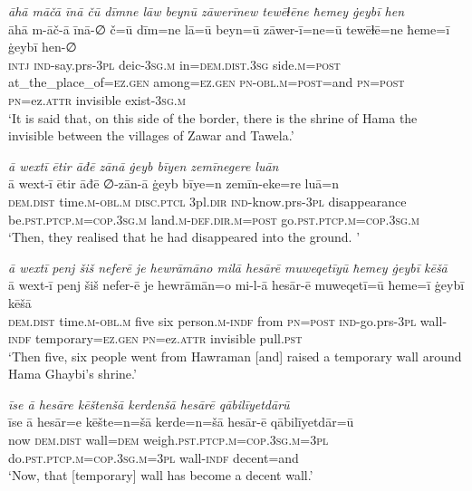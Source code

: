 \ea \label{BP.178}
\textit{āhā māčā īnā čū dīmne lāw beynū zāwerīnew tewēɫēne ħemey ġeybī hen} \\ 
\gll āhā m-āč-ā īnā-∅ č=ū dīm=ne lā=ū beyn=ū zāwer-ī=ne=ū tewēɫē=ne ħeme=ī ġeybī hen-∅ \\ 
 \textsc{intj} \textsc{ind-}say.prs\textsc{-3pl} deic\textsc{-3sg}\textsc{.m} in=\textsc{dem.dist}\textsc{.3sg} side\textsc{.m}\textsc{=\textsc{post}} at\_the\_place\_of\textsc{=ez.gen} among\textsc{=ez.gen} \textsc{pn}\textsc{-obl}\textsc{.m}\textsc{=\textsc{post}}=and \textsc{pn}\textsc{=\textsc{post}} \textsc{pn}=ez.\textsc{attr} invisible exist\textsc{-3sg}\textsc{.m} \\ 
\glt `It is said that, on this side of the border, there is the shrine of Hama the invisible between the villages of Zawar and Tawela.'
\z 
 
\ea \label{BP.197}
\textit{ā wextī ētir āđē zānā ġeyb bīyen zemīnegere luān} \\ 
\gll ā wext-ī ētir āđē ∅-zān-ā ġeyb bīye=n zemīn-eke=re luā=n \\ 
 \textsc{dem.dist} time\textsc{.m}\textsc{-obl}\textsc{.m} \textsc{disc.ptcl} 3pl\textsc{.dir} \textsc{ind-}know.prs\textsc{-3pl} disappearance be\textsc{.pst}\textsc{.ptcp}\textsc{.m}\textsc{=cop}\textsc{.3sg}\textsc{.m} land\textsc{.m}\textsc{-def}\textsc{.dir}\textsc{.m}\textsc{=\textsc{post}} go\textsc{.pst}\textsc{.ptcp}\textsc{.m}\textsc{=cop}\textsc{.3sg}\textsc{.m} \\ 
\glt `Then, they realised that he had disappeared into the ground. '
\z 
 
\ea \label{BP.203}
\textit{ā wextī penj šiš neferē je hewrāmāno milā hesārē muweqetīyū ħemey ġeybī kēšā} \\ 
\gll ā wext-ī penj šiš nefer-ē je hewrāmān=o mi-l-ā hesār-ē muweqetī=ū ħeme=ī ġeybī kēšā \\ 
 \textsc{dem.dist} time\textsc{.m}\textsc{-obl}\textsc{.m} five six person\textsc{.m}\textsc{-indf} from \textsc{pn}\textsc{=\textsc{post}} \textsc{ind-}go.prs\textsc{-3pl} wall\textsc{-indf} temporary\textsc{=ez.gen} \textsc{pn}=ez.\textsc{attr} invisible pull\textsc{.pst} \\ 
\glt `Then five, six people went from Hawraman [and] raised a temporary wall around Hama Ghaybi’s shrine.'
\z 
 
\ea \label{BP.204}
\textit{īse ā hesāre kēštenšā kerdenšā hesārē qābilīyetdārū} \\ 
\gll īse ā hesār=e kēšte=n=šā kerde=n=šā hesār-ē qābilīyetdār=ū \\ 
 now \textsc{dem.dist} wall\textsc{=dem} weigh\textsc{.pst}\textsc{.ptcp}\textsc{.m}\textsc{=cop}\textsc{.3sg}\textsc{.m}\textsc{=3pl} do\textsc{.pst}\textsc{.ptcp}\textsc{.m}\textsc{=cop}\textsc{.3sg}\textsc{.m}\textsc{=3pl} wall\textsc{-indf} decent=and \\ 
\glt `Now, that [temporary] wall has become a decent wall.'
\z 
 

